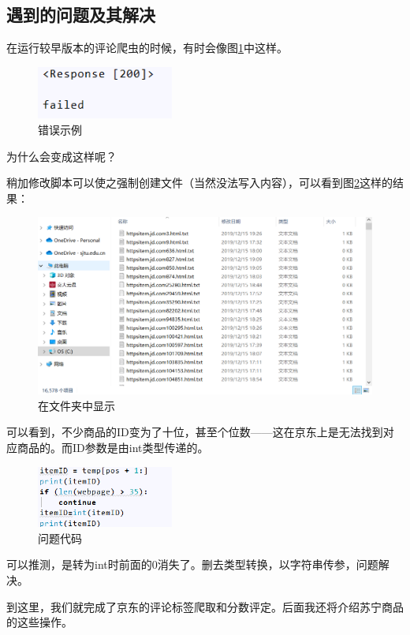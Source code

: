 \subsection{遇到的问题及其解决}

在运行较早版本的评论爬虫的时候，有时会像图\ref{img:yhb13}中这样。

\begin{figure}[htbp]
\centering
\includegraphics[width=4.5cm]{img/yhb/error_eg.png}
\caption{错误示例}
\label{img:yhb13}   %
\end{figure}

为什么会变成这样呢？

稍加修改脚本可以使之强制创建文件（当然没法写入内容），可以看到图\ref{img:yhb14}这样的结果：

\begin{figure}[htbp]
\centering
\includegraphics[width=13.5cm]{img/yhb/files_jd.png}
\caption{在文件夹中显示}
\label{img:yhb14}  %
\end{figure}

可以看到，不少商品的ID变为了十位，甚至个位数——这在京东上是无法找到对应商品的。而ID参数是由int类型传递的。


\begin{figure}[htbp]
\centering
\includegraphics[width=4.5cm]{img/yhb/problem_code.png}
\caption{问题代码}
\label{img:yhb15}
\end{figure}

可以推测，是转为int时前面的0消失了。删去类型转换，以字符串传参，问题解决。

到这里，我们就完成了京东的评论标签爬取和分数评定。后面我还将介绍苏宁商品的这些操作。
